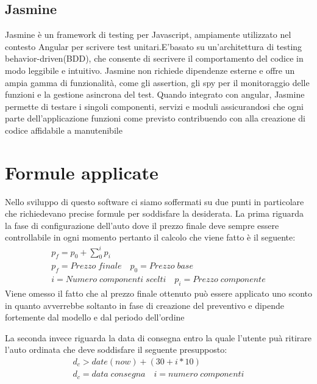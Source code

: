 \documentclass[a4paper, 11pt,oneside]{book}
\newcommand{\spacing}{\par\bigskip\noindent}
\begin{document}
        \subsection{Jasmine}
            Jasmine è un framework di testing per Javascript, ampiamente utilizzato nel contesto Angular per scrivere test unitari.E'basato su un'architettura di testing behavior-driven(BDD), che consente di secrivere il comportamento del codice in modo leggibile e intuitivo. Jasmine 
            non richiede dipendenze esterne e offre un ampia gamma di funzionalità, come gli assertion, gli spy per il monitoraggio delle funzioni e la gestione asincrona del test. Quando integrato con angular, Jasmine permette di testare i singoli componenti, servizi e moduli assicurandosi
            che ogni parte dell'applicazione funzioni come previsto contribuendo con alla creazione di codice affidabile a manutenibile
    \section{Formule applicate}
        Nello sviluppo di questo software ci siamo soffermati su due punti in particolare che richiedevano precise formule per soddisfare la desiderata.
        La prima riguarda la fase di configurazione dell'auto dove il prezzo finale deve sempre essere controllabile in ogni momento pertanto il calcolo che viene fatto è il seguente:
        \begin{gather*}
            p_{f} = p_{0} + {\sum_{0}^{i}} p_{i} \\
            p_{f} = Prezzo \; finale \quad p_{0} = Prezzo \; base \\
            i = Numero \; componenti \; scelti \quad p_{i} = Prezzo \; componente
        \end{gather*}
        Viene omesso il fatto che al prezzo finale ottenuto può essere applicato uno sconto in quanto avverrebbe soltanto in fase di creazione del preventivo e dipende fortemente dal modello e dal periodo dell'ordine
        \spacing
        La seconda invece riguarda la data di consegna entro la quale l'utente puà ritirare l'auto ordinata che deve soddisfare il seguente presupposto:
        \begin{gather*}
            d_{c} > date(now)+(30 + i*10) \\
            d_{c} = data \; consegna \quad i = numero \; componenti
        \end{gather*}
    

            
        
\end{document}
